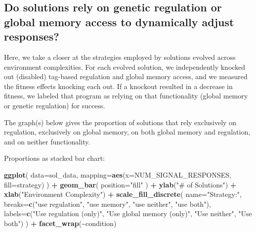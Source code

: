 \documentclass[
]{book}
\newenvironment{Shaded}{\begin{snugshade}}{\end{snugshade}}
\newcommand{\DataTypeTok}[1]{\textcolor[rgb]{0.13,0.29,0.53}{#1}}
\newcommand{\KeywordTok}[1]{\textcolor[rgb]{0.13,0.29,0.53}{\textbf{#1}}}
\newcommand{\NormalTok}[1]{#1}
\newcommand{\OperatorTok}[1]{\textcolor[rgb]{0.81,0.36,0.00}{\textbf{#1}}}
\newcommand{\StringTok}[1]{\textcolor[rgb]{0.31,0.60,0.02}{#1}}
\begin{document}
\hypertarget{do-solutions-rely-on-genetic-regulation-or-global-memory-access-to-dynamically-adjust-responses}{%
\subsection{Do solutions rely on genetic regulation or global memory access to dynamically adjust responses?}\label{do-solutions-rely-on-genetic-regulation-or-global-memory-access-to-dynamically-adjust-responses}}

Here, we take a closer at the strategies employed by solutions evolved across environment complexities.
For each evolved solution, we independently knocked out (disabled) tag-based regulation and global memory access, and we measured the fitness effects knocking each out.
If a knockout resulted in a decrease in fitness, we labeled that program as relying on that functionality (global memory or genetic regulation) for success.

The graph(s) below gives the proportion of solutions that rely exclusively on regulation, exclusively on global memory, on both global memory and regulation, and on neither functionality.

Proportions as stacked bar chart:

\begin{Shaded}
\begin{Highlighting}[]
\KeywordTok{ggplot}\NormalTok{( }\DataTypeTok{data=}\NormalTok{sol\_data, }\DataTypeTok{mapping=}\KeywordTok{aes}\NormalTok{(}\DataTypeTok{x=}\NormalTok{NUM\_SIGNAL\_RESPONSES, }\DataTypeTok{fill=}\NormalTok{strategy) ) }\OperatorTok{+}
\StringTok{  }\KeywordTok{geom\_bar}\NormalTok{(}
    \DataTypeTok{position=}\StringTok{"fill"}
\NormalTok{  ) }\OperatorTok{+}
\StringTok{  }\KeywordTok{ylab}\NormalTok{(}\StringTok{"\# of Solutions"}\NormalTok{) }\OperatorTok{+}
\StringTok{  }\KeywordTok{xlab}\NormalTok{(}\StringTok{"Environment Complexity"}\NormalTok{) }\OperatorTok{+}
\StringTok{  }\KeywordTok{scale\_fill\_discrete}\NormalTok{(}
    \DataTypeTok{name=}\StringTok{"Strategy:"}\NormalTok{,}
    \DataTypeTok{breaks=}\KeywordTok{c}\NormalTok{(}\StringTok{"use regulation"}\NormalTok{,}
             \StringTok{"use memory"}\NormalTok{,}
             \StringTok{"use neither"}\NormalTok{,}
             \StringTok{"use both"}\NormalTok{),}
    \DataTypeTok{labels=}\KeywordTok{c}\NormalTok{(}\StringTok{"Use regulation (only)"}\NormalTok{,}
             \StringTok{"Use global memory (only)"}\NormalTok{,}
             \StringTok{"Use neither"}\NormalTok{,}
             \StringTok{"Use both"}\NormalTok{)}
\NormalTok{    ) }\OperatorTok{+}
\StringTok{  }\KeywordTok{facet\_wrap}\NormalTok{(}\OperatorTok{\textasciitilde{}}\NormalTok{condition)}
\end{Highlighting}
\end{Shaded}
\end{document}
